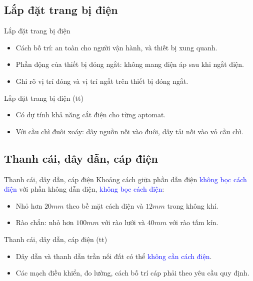 \documentclass[20pt]{beamer}
\newcommand{\noibat}[1]{\textcolor{blue}{#1}} %
\begin{document}
\subsection*{Lắp đặt trang bị điện}
\begin{frame}{Lắp đặt trang bị điện}
	\begin{itemize}
	\justifying
		\item Cách bố trí: an toàn cho người vận hành, và thiết bị xung quanh.
		
		\item Phần động của thiết bị đóng ngắt: không mang điện áp sau khi ngắt điện.
		
		\item Ghi rõ vị trí đóng và vị trí ngắt trên thiết bị đóng ngắt.				
	\end{itemize}
\end{frame}

\begin{frame}{Lắp đặt trang bị điện (tt)}
	\begin{itemize}
	\justifying
		\item Có dự tính khả năng cắt điện cho từng aptomat.
		
		\item Với cầu chì đuôi xoáy: dây nguồn nối vào đuôi, dây tải nối vào vỏ cầu chì.
	\end{itemize}
\end{frame}


\subsection*{Thanh cái, dây dẫn, cáp điện}
\begin{frame}{Thanh cái, dây dẫn, cáp điện}
\justifying
	Khoảng cách giữa phần \alert{dẫn điện} \noibat{không bọc cách điện} với phần \alert{không dẫn điện}, \noibat{không bọc cách điện}:
	\begin{itemize}
	\justifying
		\item Nhỏ hơn $20mm$ theo bề mặt cách điện và $12mm$ trong không khí.
		\item Rào chắn: nhỏ hơn $100mm$ với rào lưới và $40mm$ với rào tấm kín.
	\end{itemize}
\end{frame}

\begin{frame}{Thanh cái, dây dẫn, cáp điện (tt)}
	\begin{itemize}
	\justifying
		\item \alert{Dây dẫn} và \alert{thanh dẫn trần nối đất} có thể \noibat{không cần cách điện}.
		\item Các mạch điều khiển, đo lường, cách bố trí cáp phải theo yêu cầu quy định.
	\end{itemize}
\end{frame}
\end{document}
